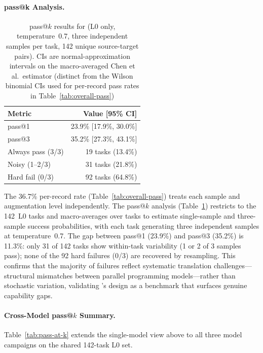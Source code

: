 \paragraph{pass@k Analysis.}
\begin{table}[!htbp]
\centering
\caption{pass@$k$ results for \qwenshort{} (L0 only, temperature~0.7, three independent samples per task, 142 unique source-target pairs). CIs are normal-approximation intervals on the macro-averaged Chen et al.\ estimator (distinct from the Wilson binomial CIs used for per-record pass rates in Table~\ref{tab:overall-pass})}
\label{tab:pass-at-k-main}
\small
\begin{tabular}{@{}lr@{}}
\toprule
Metric & Value [95\% CI] \\
\midrule
pass@1 & 23.9\% [17.9\%, 30.0\%] \\
pass@3 & 35.2\% [27.3\%, 43.1\%] \\
\midrule
Always pass (3/3) & 19 tasks (13.4\%) \\
Noisy (1--2/3) & 31 tasks (21.8\%) \\
Hard fail (0/3) & 92 tasks (64.8\%) \\
\bottomrule
\end{tabular}
\end{table}
The 36.7\% per-record rate (Table~\ref{tab:overall-pass}) treats each sample and augmentation level independently. The pass@$k$ analysis (Table~\ref{tab:pass-at-k-main}) restricts to the 142~L0 tasks and macro-averages over tasks to estimate single-sample and three-sample success probabilities, with each task generating three independent samples at temperature~0.7. The gap between pass@1 (23.9\%) and pass@3 (35.2\%) is 11.3\%: only 31 of 142 tasks show within-task variability (1 or 2 of 3 samples pass); none of the 92 hard failures (0/3) are recovered by resampling. This confirms that the majority of failures reflect systematic translation challenges---structural mismatches between parallel programming models---rather than stochastic variation, validating \parbench{}'s design as a benchmark that surfaces genuine capability gaps.

\paragraph{Cross-Model pass@$k$ Summary.}
Table~\ref{tab:pass-at-k} extends the single-model view above to all three model
campaigns on the shared 142-task L0 set.

